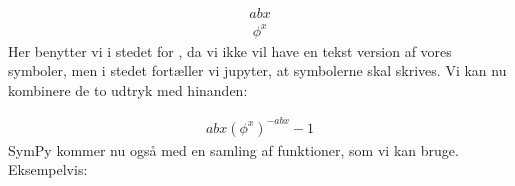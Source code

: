 \documentclass[letterpaper,10pt,english]{jupyterBook}
\begin{document}
\begin{sphinxVerbatim}[commandchars=\\\{\}]
      
     

\end{sphinxVerbatim}
\begin{equation*}
\begin{split}\displaystyle a b x\end{split}
\end{equation*}\begin{equation*}
\begin{split}\displaystyle \phi^{x}\end{split}
\end{equation*}
Her benytter vi  i stedet for , da vi ikke vil have en tekst version af vores symboler, men i stedet fortæller vi jupyter, at symbolerne skal skrives. Vi kan nu kombinere de to udtryk med hinanden:

\begin{sphinxVerbatim}[commandchars=\\\{\}]
      
\end{sphinxVerbatim}
\begin{equation*}
\begin{split}\displaystyle a b x \left(\phi^{x}\right)^{- a b x} - 1\end{split}
\end{equation*}
SymPy kommer nu også med en samling af funktioner, som vi kan bruge. Eksempelvis:
\end{document}
